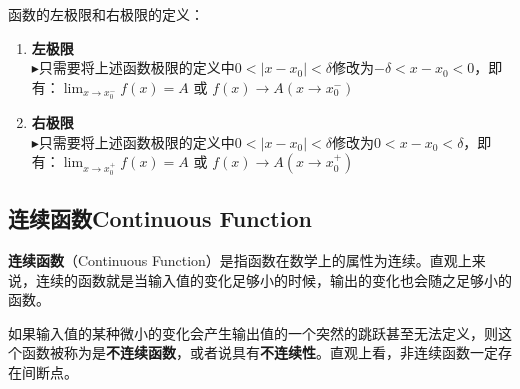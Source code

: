 \documentclass[UTF8]{ctexart}
\begin{document}
\begin{info}[Notice:]函数的左极限和右极限的定义：
\begin{enumerate}
	\item \textbf{左极限}\\
	$\blacktriangleright$只需要将上述函数极限的定义中$0 < |x-x_0| < \delta$修改为$-\delta < x-x_0 < 0$，即有：\( \lim_{x \to x_0^{-}} f(x) = A  \text{ 或 \ }f(x) \to A (x \to x_0^{-})\)
	\item \textbf{右极限}\\
	$\blacktriangleright$只需要将上述函数极限的定义中$0 < |x-x_0| < \delta$修改为$0 < x-x_0 < \delta$，即有：\( \lim_{x \to x_0^{+}} f(x) = A \text{ 或 \ }f(x) \to A (x \to x_0^{+})\)
\end{enumerate}
\end{info}
\subsection{连续函数Continuous Function}
\textbf{连续函数}（Continuous Function）是指函数在数学上的属性为连续。直观上来说，连续的函数就是当输入值的变化足够小的时候，输出的变化也会随之足够小的函数。

如果输入值的某种微小的变化会产生输出值的一个突然的跳跃甚至无法定义，则这个函数被称为是\textbf{不连续函数}，或者说具有\textbf{不连续性}。直观上看，非连续函数一定存在间断点。
\end{document}
